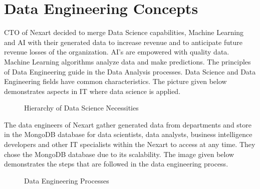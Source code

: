 \documentclass[a4Paper,12pt]{report}
\begin{document}
\section{Data Engineering Concepts}
CTO of Nexart decided to merge Data Science capabilities, Machine Learning and AI with their generated data to increase revenue and to anticipate future revenue losses of the organization. AI’s are empowered with quality data. Machine Learning algorithms analyze data and make predictions. The principles of Data Engineering guide in the Data Analysis processes. Data Science and Data Engineering fields have common characteristics. The picture given below demonstrates aspects in IT where data science is applied.
\begin{figure}[H]
\centering
{}
\caption{Hierarchy of Data Science Necessities}
\end{figure}
The data engineers of Nexart gather generated data from departments and store in the MongoDB database for data scientists, data analysts, business intelligence developers and other IT specialists within the Nexart to access at any time. They chose the MongoDB database due to its scalability. The image given below demonstrates the steps that are followed in the data engineering process. 
\begin{figure}[H]
\centering
{}
\caption{Data Engineering Processes}
\end{figure}
\end{document}

